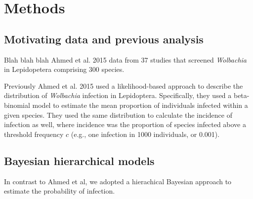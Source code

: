 \documentclass[11pt]{article}
\begin{document}
\raggedright
\setlength{\parindent}{0.3in}

\section{Methods}
\subsection{Motivating data and previous analysis}
Blah blah blah Ahmed et al. 2015 data from 37 studies that screened \emph{Wolbachia} in Lepidopetera comprising 300 species. 

Previously Ahmed et al. 2015 used a likelihood-based approach to describe the distribution of \emph{Wolbachia} infection in Lepidoptera. Specifically, they used a beta-binomial model to estimate the mean proportion of individuals infected within a given species. They used the same distribution to calculate the incidence of infection as well, where incidence was the proportion of species infected above a threshold frequency $c$ (e.g., one infection in 1000 individuals, or 0.001). 

\subsection{Bayesian hierarchical models}
In contrast to Ahmed et al, we adopted a hierachical Bayesian approach to estimate the probability of infection. 


 
\end{document}
